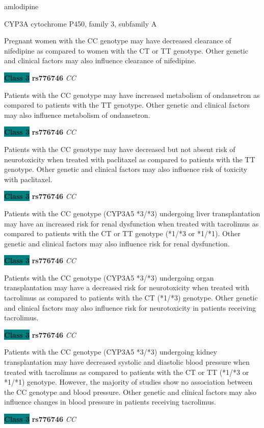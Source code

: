 \documentclass{resume} %
\begin{document}
\begin{rSection}{ amlodipine }
\begin{rSubsection}{ CYP3A }{ cytochrome P450, family 3, subfamily A }{}{}
\item[] Pregnant women with the CC genotype may have decreased clearance of nifedipine as compared to women with the CT or TT genotype. Other genetic and clinical factors may also influence clearance of nifedipine.\item \textbf{\colorbox{teal} {Class 3}} \textbf{ rs776746 } \textit{ CC }
\item[] Patients with the CC genotype may have increased metabolism of ondansetron as compared to patients with the TT genotype. Other genetic and clinical factors may also influence metabolism of ondansetron.\item \textbf{\colorbox{teal} {Class 3}} \textbf{ rs776746 } \textit{ CC }
\item[] Patients with the CC genotype may have decreased but not absent risk of neurotoxicity when treated with paclitaxel as compared to patients with the TT genotype. Other genetic and clinical factors may also influence risk of toxicity with paclitaxel.\item \textbf{\colorbox{teal} {Class 3}} \textbf{ rs776746 } \textit{ CC }
\item[] Patients with the CC genotype (CYP3A5 *3/*3) undergoing liver transplantation may have an increased risk for renal dysfunction when treated with tacrolimus as compared to patients with the CT or TT genotype (*1/*3 or *1/*1). Other genetic and clinical factors may also influence risk for renal dysfunction. \item \textbf{\colorbox{teal} {Class 3}} \textbf{ rs776746 } \textit{ CC }
\item[] Patients with the CC genotype (CYP3A5 *3/*3) undergoing organ transplantation may have a decreased risk for neurotoxicity when treated with tacrolimus as compared to patients with the CT (*1/*3) genotype. Other genetic and clinical factors may also influence risk for neurotoxicity in patients receiving tacrolimus. \item \textbf{\colorbox{teal} {Class 3}} \textbf{ rs776746 } \textit{ CC }
\item[] Patients with the CC genotype (CYP3A5 *3/*3) undergoing kidney transplantation may have decreased systolic and diastolic blood pressure when treated with tacrolimus as compared to patients with the CT or TT (*1/*3 or *1/*1) genotype. However, the majority of studies show no association between the CC genotype and blood pressure. Other genetic and clinical factors may also influence changes in blood pressure in patients receiving tacrolimus.\item \textbf{\colorbox{teal} {Class 3}} \textbf{ rs776746 } \textit{ CC }

\end{rSubsection}
\end{rSection}
\end{document}
